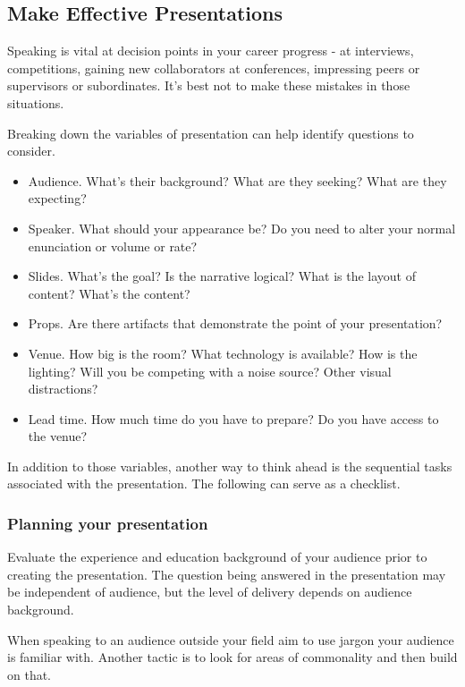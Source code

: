 \subsection*{Make Effective Presentations\label{sec:effective-presentations}}


Speaking is vital at decision points in your career progress - at interviews, competitions, gaining new collaborators at conferences, impressing peers or supervisors or subordinates. It's best not to make these mistakes in those situations.

Breaking down the variables of presentation can help identify questions to consider. 
\begin{itemize}
    \item Audience. What's their background? What are they seeking? What are they expecting?
    \item Speaker. What should your appearance be? Do you need to alter your normal enunciation or volume or rate?
    \item Slides. What's the goal? Is the narrative logical? What is the layout of content? What's the content? 
    \item Props. Are there artifacts that demonstrate the point of your presentation?
    \item Venue. How big is the room? What technology is available? How is the lighting? Will you be competing with a noise source? Other visual distractions?
    \item Lead time. How much time do you have to prepare? Do you have access to the venue? 
\end{itemize}

In addition to those variables, another way to think ahead is the sequential tasks associated with the presentation. 
The following can serve as a checklist.

\subsubsection*{Planning your presentation}

Evaluate the experience and education background of your audience prior to creating the presentation. The question being answered in the presentation may be independent of audience, but the level of delivery depends on audience background.

When speaking to an audience outside your field aim to use jargon your audience is familiar with. Another tactic is to look for areas of commonality and then build on that.

